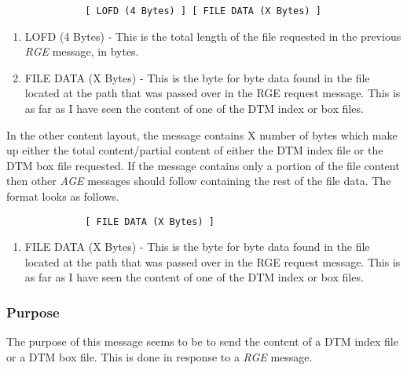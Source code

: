             \begin{verbatim}
              [ LOFD (4 Bytes) ] [ FILE DATA (X Bytes) ]
            \end{verbatim}

            \begin{enumerate}
              \item LOFD (4 Bytes) - This is the total length of the file
              requested in the previous \emph{RGE} message, in bytes.

              \item FILE DATA (X Bytes) - This is the byte for byte data found
              in the file located at the path that was passed over in the RGE
              request message. This is as far as I have seen the content of
              one of the DTM index or box files.
            \end{enumerate}

            In the other content layout, the message contains X number of
            bytes which make up either the total content/partial content of
            either the DTM index file or the DTM box file requested. If the
            message contains only a portion of the file content then other
            \emph{AGE} messages should follow containing the rest of the file
            data. The format looks as follows.

            \begin{verbatim}
              [ FILE DATA (X Bytes) ]
            \end{verbatim}

            \begin{enumerate}
              \item FILE DATA (X Bytes) - This is the byte for byte data found
              in the file located at the path that was passed over in the RGE
              request message. This is as far as I have seen the content of
              one of the DTM index or box files.
            \end{enumerate}

            \subsubsection{Purpose}

            The purpose of this message seems to be to send the content of a
            DTM index file or a DTM box file. This is done in response to a
            \emph{RGE} message.

